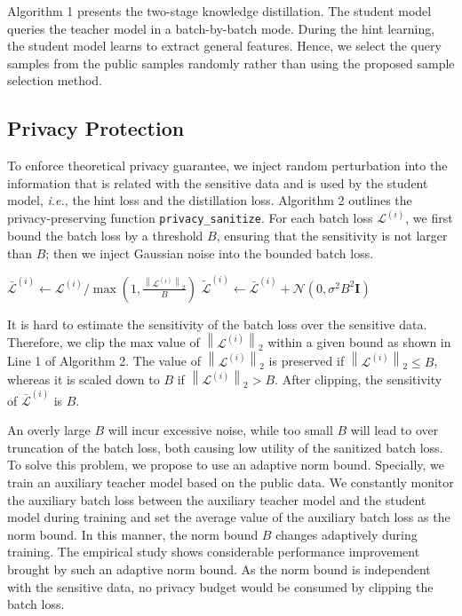 \documentclass[letterpaper]{article} %
\begin{document}
Algorithm 1 presents the two-stage knowledge distillation. The student model queries the teacher model in a batch-by-batch mode. During the hint learning, the student model learns to extract general features. Hence, we select the query samples from the public samples randomly rather than using the proposed sample selection method.

\subsection{Privacy Protection}
To enforce theoretical privacy guarantee, we inject random perturbation into the information that is related with the sensitive data and is used by the student model, \textit{i.e.}, the hint loss and the distillation loss. Algorithm 2 outlines the privacy-preserving function \texttt{privacy\_sanitize}. For each batch loss $\mathcal{L}^{(i)}$, we first bound the batch loss by a threshold $B$, ensuring that the sensitivity is not larger than $B$; then we inject Gaussian noise into the bounded batch loss.

\begin{algorithm}[tb]
\SetAlgoVlined
\small
{}
$\bar{\mathcal{L}}^{(i)}\gets \mathcal{L}^{(i)}/\max { (1,\frac { \left\| { \mathcal{L}}^{(i)} \right\|_2}{B})}$\;
$\widetilde{\mathcal{L}}^{(i)}\gets \bar{\mathcal{L}}^{(i)} + \mathcal{N}(0,\sigma^2B^2\textbf{I})$\;
\small\caption{Function Privacy Sanitize}
\end{algorithm}

It is hard to estimate the sensitivity of the batch loss over the sensitive data. Therefore, we clip the max value of $ \left\| \mathcal{L}^{(i)} \right\|_2 $ within a given bound as shown in Line 1 of Algorithm 2. The value of $ \left\| \mathcal{L}^{(i)} \right\| _2$ is preserved if $\left\| { \mathcal{L}}^{(i)} \right\|_2\leq B$, whereas it is scaled down to $B$ if $\left\| { \mathcal{L}}^{(i)} \right\|_2> B$. After clipping, the sensitivity of $\bar{\mathcal{L}}^{(i)}$ is $B$. 

An overly large $B$ will incur excessive noise, while too small $B$ will lead to over truncation of the batch loss, both causing low utility of the sanitized batch loss. To solve this problem, we propose to use an adaptive norm bound. Specially, we train an auxiliary teacher model based on the public data. We constantly monitor the auxiliary batch loss between the auxiliary teacher model and the student model during training and set the average value of the auxiliary batch loss as the norm bound. In this manner, the norm bound $B$ changes adaptively during training. The empirical study shows considerable performance improvement brought by such an adaptive norm bound. As the norm bound is independent with the sensitive data, no privacy budget would be consumed by clipping the batch loss.
\end{document}
